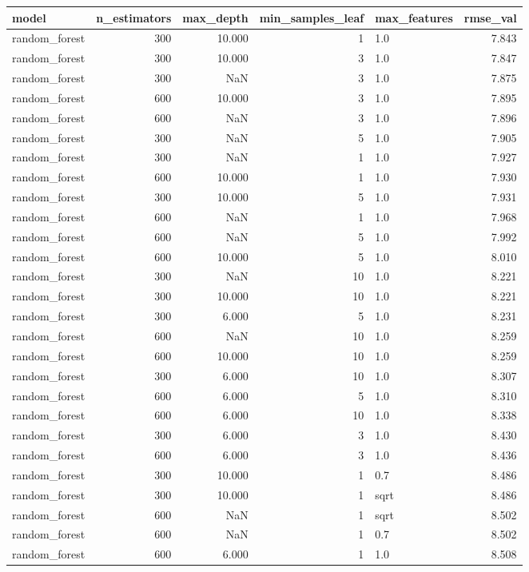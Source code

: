 \begin{tabular}{lrrrlr}
\toprule
model & n_estimators & max_depth & min_samples_leaf & max_features & rmse_val \\
\midrule
random_forest & 300 & 10.000 & 1 & 1.0 & 7.843 \\
random_forest & 300 & 10.000 & 3 & 1.0 & 7.847 \\
random_forest & 300 & NaN & 3 & 1.0 & 7.875 \\
random_forest & 600 & 10.000 & 3 & 1.0 & 7.895 \\
random_forest & 600 & NaN & 3 & 1.0 & 7.896 \\
random_forest & 300 & NaN & 5 & 1.0 & 7.905 \\
random_forest & 300 & NaN & 1 & 1.0 & 7.927 \\
random_forest & 600 & 10.000 & 1 & 1.0 & 7.930 \\
random_forest & 300 & 10.000 & 5 & 1.0 & 7.931 \\
random_forest & 600 & NaN & 1 & 1.0 & 7.968 \\
random_forest & 600 & NaN & 5 & 1.0 & 7.992 \\
random_forest & 600 & 10.000 & 5 & 1.0 & 8.010 \\
random_forest & 300 & NaN & 10 & 1.0 & 8.221 \\
random_forest & 300 & 10.000 & 10 & 1.0 & 8.221 \\
random_forest & 300 & 6.000 & 5 & 1.0 & 8.231 \\
random_forest & 600 & NaN & 10 & 1.0 & 8.259 \\
random_forest & 600 & 10.000 & 10 & 1.0 & 8.259 \\
random_forest & 300 & 6.000 & 10 & 1.0 & 8.307 \\
random_forest & 600 & 6.000 & 5 & 1.0 & 8.310 \\
random_forest & 600 & 6.000 & 10 & 1.0 & 8.338 \\
random_forest & 300 & 6.000 & 3 & 1.0 & 8.430 \\
random_forest & 600 & 6.000 & 3 & 1.0 & 8.436 \\
random_forest & 300 & 10.000 & 1 & 0.7 & 8.486 \\
random_forest & 300 & 10.000 & 1 & sqrt & 8.486 \\
random_forest & 600 & NaN & 1 & sqrt & 8.502 \\
random_forest & 600 & NaN & 1 & 0.7 & 8.502 \\
random_forest & 600 & 6.000 & 1 & 1.0 & 8.508 \\

\end{tabular}

